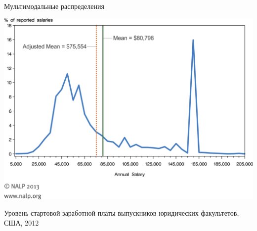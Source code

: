 \documentclass[11pt,pdf,utf8,hyperref={unicode},aspectratio=169]{beamer}
\begin{document}
\begin{frame}{Мультимодальные распределения}
		\begin{center}
			\includegraphics[height=0.7\textheight]{nalp2012.png}
		\end{center}
		Уровень стартовой заработной платы выпускников юридических факультетов, США, 2012
\end{frame}
\end{document}
